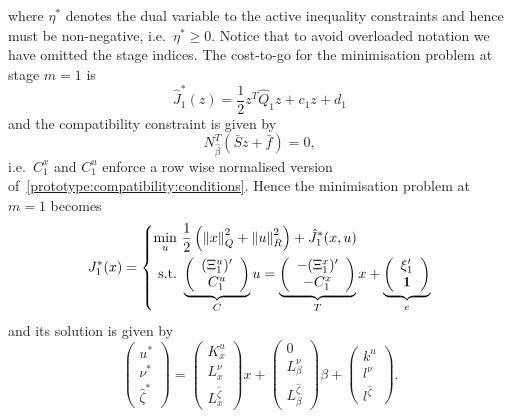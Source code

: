 \documentclass{ifacconf}
\providecommand{\norm}[1]{\left\|#1\right\|}
\begin{document}
where $\eta^\ast$ denotes the dual variable to the active inequality constraints and hence must
be non-negative, i.e.~$\eta^\ast\geq0$. Notice that to avoid
overloaded notation we have omitted the stage indices.
The cost-to-go for the minimisation problem at stage $m=1$ is
\[
	\hat J_1^\ast(z) = \frac{1}{2}z^T
    \hat Q_1 z + c_1 z + d_1
\]
and the compatibility constraint is given by
\begin{equation}\label{prototype:compatibility:conditions}
	N_{\hat\beta}^T(\bar S z + \bar f) = 0,
\end{equation}
i.e.\ $C_1^x$ and $C_1^u$ enforce a row wise normalised version of~\eqref{prototype:compatibility:conditions}.
Hence the minimisation problem at $m=1$ becomes
\[
	J_1^\ast(x) = \left\{\begin{split}
	\min_{u} \ & \frac{1}{2}\left(\norm{x}^2_Q + \norm{u}_R^2\right) + \hat J_{1}^\ast(x,u)\\
    \text{s.t.} \ & 
    \underbrace{\left(\begin{array}{c}
    (\Xi_1^u)^\prime \\ C_1^u
    \end{array}\right)}_{\bar C}
    u
    = \underbrace{\left(\begin{array}{c}-(\Xi^x_1)^\prime \\ -C_1^x\end{array}\right)}_{
    \bar T
    }x + 
    \underbrace{\left(\begin{array}{c}\xi_1^\prime\\  {\bf{1}} \end{array}\right)}_{\bar e}
    \end{split}\right.
\]
and its solution is given by
\[
	\left(\begin{array}{c}
	u^\ast \\
	\nu^\ast \\
	\hat\zeta^\ast
	\end{array}\right) = \left(\begin{array}{c}K^u_x\\ L^{\nu}_x \\ L^{\hat\zeta}_x
	\end{array}\right)x + 
	\left(\begin{array}{c}0\\ L^{\nu}_\beta \\ L^{\hat\zeta}_{\beta}
	\end{array}\right)\beta + \left(\begin{array}{c}k^u\\ l^{\nu} \\ l^{\hat\zeta}
	\end{array}\right).
\]
\end{document}
